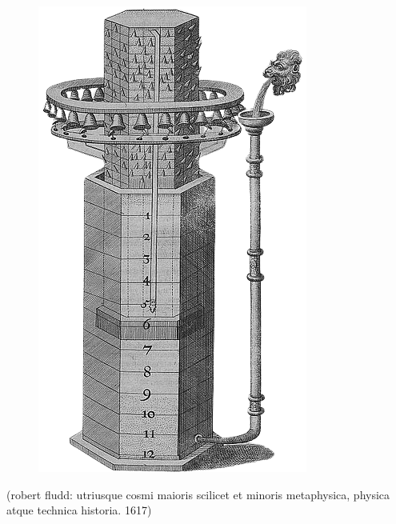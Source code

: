 \documentclass[12pt,a4paper,british,landscape]{article}
\begin{document}
\begin{figure}[h]
    \begin{center}
        \includegraphics[scale=0.85]{ waterclock-removebg-preview.png }
    \end{center}
\end{figure}

\vspace{-0.5cm}

\begin{center}
    (robert fludd: utriusque cosmi maioris scilicet et minoris metaphysica, physica atque technica historia. 1617)
\end{center}
\end{document}
